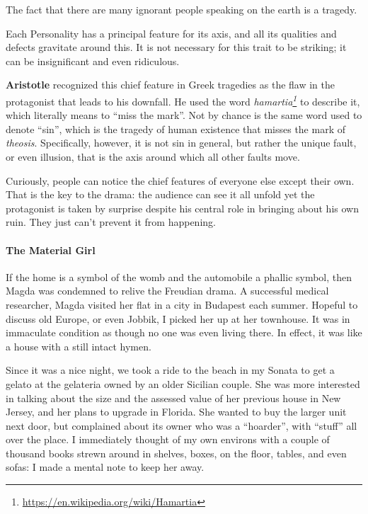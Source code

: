 \begin{quotex}
The fact that there are many ignorant people speaking on the earth is a tragedy.
\end{quotex}


\begin{quotex}
Each Personality has a principal feature for its axis, and all its qualities and defects gravitate around this. It is not necessary for this trait to be striking; it can be insignificant and even ridiculous.
\end{quotex}


\textbf{Aristotle} recognized this chief feature in Greek tragedies as the flaw in the protagonist that leads to his downfall. He used the word \emph{hamartia\footnote{\url{https://en.wikipedia.org/wiki/Hamartia}}} to describe it, which literally means to ``miss the mark''. Not by chance is the same word used to denote ``sin'', which is the tragedy of human existence that misses the mark of \emph{theosis}. Specifically, however, it is not sin in general, but rather the unique fault, or even illusion, that is the axis around which all other faults move.

Curiously, people can notice the chief features of everyone else except their own. That is the key to the drama: the audience can see it all unfold yet the protagonist is taken by surprise despite his central role in bringing about his own ruin. They just can't prevent it from happening.

\paragraph{The Material Girl}


If the home is a symbol of the womb and the automobile a phallic symbol, then Magda was condemned to relive the Freudian drama. A successful medical researcher, Magda visited her flat in a city in Budapest each summer. Hopeful to discuss old Europe, or even Jobbik, I picked her up at her townhouse. It was in immaculate condition as though no one was even living there. In effect, it was like a house with a still intact hymen.

Since it was a nice night, we took a ride to the beach in my Sonata to get a gelato at the gelateria owned by an older Sicilian couple. She was more interested in talking about the size and the assessed value of her previous house in New Jersey, and her plans to upgrade in Florida. She wanted to buy the larger unit next door, but complained about its owner who was a ``hoarder'', with ``stuff'' all over the place. I immediately thought of my own environs with a couple of thousand books strewn around in shelves, boxes, on the floor, tables, and even sofas: I made a mental note to keep her away.

